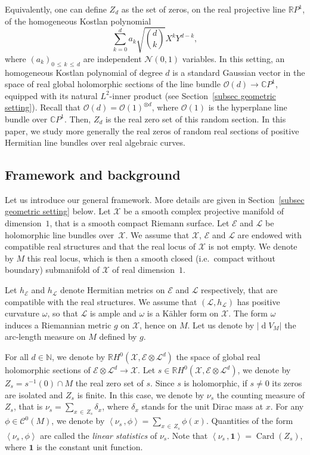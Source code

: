\documentclass[AHL,Unicode,longabstracts,published]{cedram}
\DeclareMathOperator{\card}{Card}
\DeclareMathOperator{\dmesure}{d}
\newcommand{\E}{\mathcal{E}}
\newcommand{\X}{\mathcal{X}}
\renewcommand{\L}{\mathcal{L}}
\newcommand{\clN}{\mathcal{N}}
\newcommand{\clC}{\mathcal{C}}
\newcommand{\clO}{\mathcal{O}}
\newcommand{\C}{\mathbb{C}}
\newcommand{\N}{\mathbb{N}}
\newcommand{\R}{\mathbb{R}}
\newcommand{\bfun}{\mathbf{1}}
\newcommand{\norm}[1]{\left\lvert #1 \right\rvert}
\newcommand{\prsc}[2]{\left\langle #1\,, #2 \right\rangle}
\newcommand{\rmes}[1]{\norm{\dmesure\! V_{#1}}}
\renewcommand{\H}{H^0(\X,\E \otimes \L^d)}
\renewcommand{\leq}{\leqslant}
\begin{document}
Equivalently, one can define $Z_d$ as the set of zeros, on the real projective line $\R P^1$, of the homogeneous Kostlan polynomial
\[
\sum_{k=0}^d a_k \sqrt{\binom{d}{k}} X^kY^{d-k},
\]
where $(a_k)_{0\,\leq\,k\,\leq\,d}$ are independent $\clN(0,1)$ variables. In this setting, an homogeneous Kostlan polynomial of degree $d$ is a standard Gaussian vector in the space of real global holomorphic sections of the line bundle $\clO(d) \to \C P^1$, equipped with its natural $L^2$-inner product (see Section~\ref{subsec geometric setting}). Recall that $\clO(d) = \clO(1)^{\otimes d}$, where $\clO(1)$ is the hyperplane line bundle over $\C P^1$. Then, $Z_d$ is the real zero set of this random section. In this paper, we study more generally the real zeros of random real sections of positive Hermitian line bundles over real algebraic curves.


\subsection*{Framework and background}

Let us introduce our general framework. More details are given in Section~\ref{subsec geometric setting} below. Let $\X$ be a smooth complex projective manifold of dimension~$1$, that is a smooth compact Riemann surface. Let $\E$ and $\L$ be holomorphic line bundles over~$\X$. We assume that $\X$, $\E$ and $\L$ are endowed with compatible real structures and that the real locus of $\X$ is not empty. We denote by $M$ this real locus, which is then a smooth closed (i.e.~compact without boundary) submanifold of $\X$ of real dimension~$1$.

Let $h_\E$ and $h_\L$ denote Hermitian metrics on $\E$ and $\L$ respectively, that are compatible with the real structures. We assume that $(\L,h_\L)$ has positive curvature $\omega$, so that $\L$ is ample and $\omega$ is a K\"ahler form on $\X$. The form $\omega$ induces a Riemannian metric $g$ on $\X$, hence on $M$. Let us denote by $\rmes{M}$ the arc-length measure on $M$ defined by $g$.

For all $d \in \N$, we denote by $\R \H$ the space of global real holomorphic sections of $\E \otimes \L^d \to \X$. Let $s \in \R \H$, we denote by $Z_s=s^{-1}(0)\cap M$ the real zero set of $s$. Since $s$ is holomorphic, if $s \neq 0$ its zeros are isolated and $Z_s$ is finite. In this case, we denote by $\nu_s$ the counting measure of $Z_s$, that is $\nu_s = \sum_{x\,\in\, Z_s} \delta_x$, where $\delta_x$ stands for the unit Dirac mass at $x$. For any $\phi \in \clC^0(M)$, we denote by $\prsc{\nu_s}{\phi} = \sum_{x\,\in\,Z_s} \phi(x)$. Quantities of the form $\prsc{\nu_s}{\phi}$ are called the \emph{linear statistics} of $\nu_s$. Note that $\prsc{\nu_s}{\bfun} = \card(Z_s)$, where $\bfun$ is the constant unit function.
\end{document}
